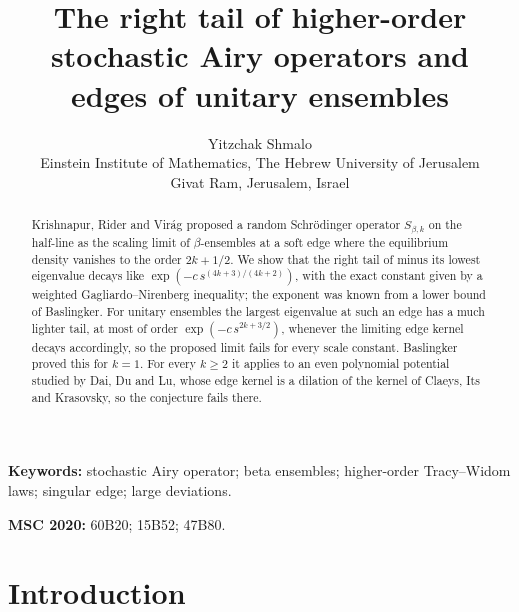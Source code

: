 \documentclass[11pt]{article}
\title{The right tail of higher-order stochastic Airy operators and edges of unitary ensembles}
\author{Yitzchak Shmalo\\
Einstein Institute of Mathematics, The Hebrew University of Jerusalem\\
Givat Ram, Jerusalem, Israel}
\date{}
\theoremstyle{remark}
\begin{document}
\maketitle

\begin{abstract}
Krishnapur, Rider and Vir\'ag proposed a random Schr\"odinger operator $S_{\beta,k}$ on the half-line as the
scaling limit of $\beta$-ensembles at a soft edge where the equilibrium density vanishes to the order $2k+1/2$. We
show that the right tail of minus its lowest eigenvalue decays like $\exp(-c\,s^{(4k+3)/(4k+2)})$, with the exact
constant given by a weighted Gagliardo--Nirenberg inequality; the exponent was known from a lower bound of
Baslingker. For unitary ensembles the largest eigenvalue at such an edge has a much lighter tail, at most of order
$\exp(-c\,s^{2k+3/2})$, whenever the limiting edge kernel decays accordingly, so the proposed limit fails for every
scale constant. Baslingker proved this for $k=1$. For every $k\ge2$ it applies to an even polynomial potential
studied by Dai, Du and Lu, whose edge kernel is a dilation of the kernel of Claeys, Its and Krasovsky, so the
conjecture fails there.
\end{abstract}

\noindent\textbf{Keywords:} stochastic Airy operator; beta ensembles; higher-order Tracy--Widom laws; singular
edge; large deviations.

\noindent\textbf{MSC 2020:} 60B20; 15B52; 47B80.

\section{Introduction}\label{sec:intro}
\end{document}
